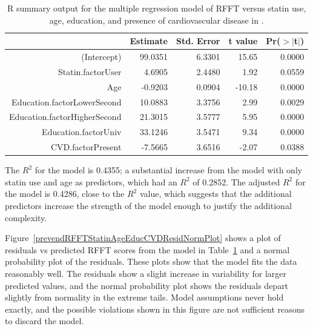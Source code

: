 \begin{table}[ht]
\centering
\begin{tabular}{rrrrr}
  \hline
 & Estimate & Std. Error & t value & Pr($>$$|$t$|$) \\ 
  \hline
(Intercept) & 99.0351 & 6.3301 & 15.65 & 0.0000 \\ 
  Statin.factorUser & 4.6905 & 2.4480 & 1.92 & 0.0559 \\ 
  Age & -0.9203 & 0.0904 & -10.18 & 0.0000 \\ 
  Education.factorLowerSecond & 10.0883 & 3.3756 & 2.99 & 0.0029 \\ 
  Education.factorHigherSecond & 21.3015 & 3.5777 & 5.95 & 0.0000 \\ 
  Education.factorUniv & 33.1246 & 3.5471 & 9.34 & 0.0000 \\ 
  CVD.factorPresent & -7.5665 & 3.6516 & -2.07 & 0.0388 \\ 
   \hline
\end{tabular}
\caption{\textsf{R} summary output for the multiple regression model of RFFT versus statin use, age, education, and presence of cardiovascular disease in .} 
\label{prevendRFFTStatinAgeEducationCVD}
\end{table}

The $R^2$ for the model is 0.4355; a substantial increase from the model with only statin use and age as predictors, which had an $R^2$ of 0.2852. The adjusted $R^2$ for the model is 0.4286, close to the $R^2$ value, which suggests that the additional predictors increase the strength of the model enough to justify the additional complexity.

Figure~\ref{prevendRFFTStatinAgeEducCVDResidNormPlot} shows a plot of residuals vs predicted RFFT scores from the model in Table~\ref{prevendRFFTStatinAgeEducationCVD} and a normal probability plot of the residuals. These plots show that the model fits the data reasonably well. The residuals show a slight increase in variability for larger predicted values, and the normal probability plot shows the residuals depart slightly from normality in the extreme tails.  Model assumptions never hold exactly, and the possible violations shown in this figure are not sufficient reasons to discard the model.

